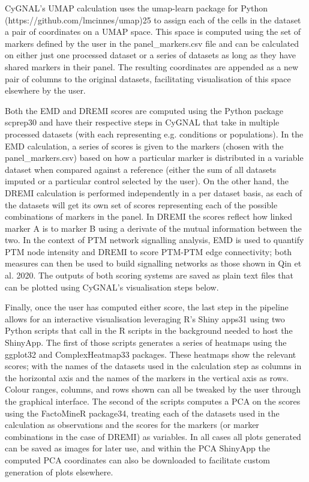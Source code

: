 CyGNAL’s UMAP calculation uses the umap-learn package for Python (https://github.com/lmcinnes/umap)25 to assign each of the cells in the dataset a pair of coordinates on a UMAP space. This space is computed using the set of markers defined by the user in the panel\_markers.csv file and can be calculated on either just one processed dataset or a series of datasets as long as they have shared markers in their panel. The resulting coordinates are appended as a new pair of columns to the original datasets, facilitating visualisation of this space elsewhere by the user.


Both the EMD and DREMI scores are computed using the Python package scprep30 and have their respective steps in CyGNAL that take in multiple processed datasets (with each representing e.g. conditions or populations). In the EMD calculation, a series of scores is given to the markers (chosen with the panel\_markers.csv) based on how a particular marker is distributed in a variable dataset when compared against a reference (either the sum of all datasets imputed or a particular control selected by the user). On the other hand, the DREMI calculation is performed independently in a per dataset basis, as each of the datasets will get its own set of scores representing each of the possible combinations of markers in the panel. In DREMI the scores reflect how linked marker A is to marker B using a derivate of the mutual information between the two. In the context of PTM network signalling analysis, EMD is used to quantify PTM node intensity and DREMI to score PTM-PTM edge connectivity; both measures can then be used to build signalling networks as those shown in Qin et al. 2020. The outputs of both scoring systems are saved as plain text files that can be plotted using CyGNAL’s visualisation steps below.

Finally, once the user has computed either score, the last step in the pipeline allows for an interactive visualisation leveraging R’s Shiny apps31 using two Python scripts that call in the R scripts in the background needed to host the ShinyApp. The first of those scripts generates a series of heatmaps using the ggplot32 and ComplexHeatmap33 packages. These heatmaps show the relevant scores; with the names of the datasets used in the calculation step as columns in the horizontal axis and the names of the markers in the vertical axis as rows. Colour ranges, columns, and rows shown can all be tweaked by the user through the graphical interface. The second of the scripts computes a PCA on the scores using the FactoMineR package34, treating each of the datasets used in the calculation as observations and the scores for the markers (or marker combinations in the case of DREMI) as variables. In all cases all plots generated can be saved as images for later use, and within the PCA ShinyApp the computed PCA coordinates can also be downloaded to facilitate custom generation of plots elsewhere.


